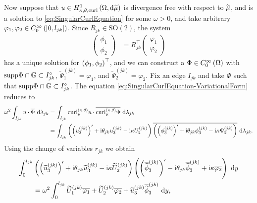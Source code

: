 Now suppose that $u\in H^1_{\kappa,\theta,\mathrm{curl}}\left( \Omega, \mathrm{d}\widetilde{\mu} \right)$ is divergence free with respect to $\widetilde{\mu}$, and is a solution to \eqref{eq:SingularCurlEquation} for some $\omega>0$, and take arbitrary $\varphi_1,\varphi_2\in C^{\infty}_{0}\left( \left[ 0,l_{jk} \right] \right)$.
Since $R_{jk}\in\mathrm{SO}(2)$, the system
\begin{align*}
	\begin{pmatrix} \phi_1 \\ \phi_2 \end{pmatrix} &= R_{jk}^\top \begin{pmatrix} \varphi_1 \\ \varphi_2 \end{pmatrix}
\end{align*}
has a unique solution for $\left( \phi_1,\phi_2 \right)^\top$, and we can construct a $\Phi\in C^{\infty}_{0}\left( \Omega \right)$ with $\mathrm{supp}\Phi\cap\mathbb{G}\subset I_{jk}^{\circ}$, $\widetilde{\Psi}_1^{(jk)}=\varphi_1$, and $\widetilde{\Psi}_2^{(jk)}=\varphi_2$.
Fix an edge $I_{jk}$ and take $\Phi$ such that $\mathrm{supp}\Phi\cap\mathbb{G}\subset I_{jk}^{\circ}$.
The equation \eqref{eq:SingularCurlEquation-VariationalForm} reduces to
\begin{align*}
	\omega^2 \int_{I_{jk}} u\cdot\overline{\Phi}  \ \mathrm{d}\lambda_{jk}
	&= \int_{I_{jk}} \mathrm{curl}_{\mu}^{\left( \kappa, \theta \right)}u\cdot\overline{\mathrm{curl}_{\mu}^{\left( \kappa, \theta \right)}\Phi}  \ \mathrm{d}\lambda_{jk} \\
	&= \int_{I_{jk}} \left(  \left( u_3^{(jk)} \right)' + \mathrm{i}\theta_{jk} u_3^{(jk)} - \mathrm{i}\kappa U_2^{(jk)}  \right)\overline{\left(  \left( \phi_3^{(jk)} \right)' + \mathrm{i}\theta_{jk} \phi_3^{(jk)} - \mathrm{i}\kappa \Psi_2^{(jk)}  \right)}  \ \mathrm{d}\lambda_{jk}.
\end{align*}
Using the change of variables $r_{jk}$ we obtain
\begin{align*}
	\int_0^{l_{jk}} & \left(  \left( \widetilde{u}_3^{(jk)} \right)' + \mathrm{i}\theta_{jk} \widetilde{u}_3^{(jk)} - \mathrm{i}\kappa \widetilde{U}_2^{(jk)}  \right) \left(  \left( \overline{\widetilde{\phi}}_3^{(jk)} \right)' - \mathrm{i}\theta_{jk} \overline{\widetilde{\phi}}_3^{(jk)} + \mathrm{i}\kappa \overline{\varphi_2}  \right) \ \mathrm{d} y \\
	&= \omega^2 \int_0^{l_{jk}} \widetilde{U}_1^{(jk)}\overline{\varphi_1} + \widetilde{U}_2^{(jk)}\overline{\varphi_2} + \widetilde{u}_3^{(jk)}\overline{\widetilde{\phi}}_3^{(jk)} \ \mathrm{d} y,
\end{align*}
